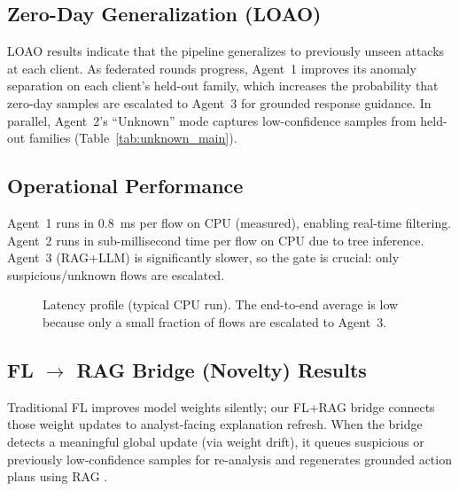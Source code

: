 \subsection{Zero-Day Generalization (LOAO)}
\label{sec:zeroday-narrative}

LOAO results indicate that the pipeline generalizes to previously unseen attacks at each client. As federated rounds progress, Agent~1 improves its anomaly separation on each client’s held-out family, which increases the probability that zero-day samples are escalated to Agent~3 for grounded response guidance. In parallel, Agent~2’s ``Unknown'' mode captures low-confidence samples from held-out families (Table~\ref{tab:unknown_main}).

\subsection{Operational Performance}
\label{sec:operational}

Agent~1 runs in \SI{0.8}{\milli\second} per flow on CPU (measured), enabling real-time filtering. Agent~2 runs in sub-millisecond time per flow on CPU due to tree inference. Agent~3 (RAG+LLM) is significantly slower, so the gate is crucial: only suspicious/unknown flows are escalated.

\begin{figure}[t]
\centering
{}
\caption{Latency profile (typical CPU run). The end-to-end average is low because only a small fraction of flows are escalated to Agent~3.}
\label{fig:latency}
\end{figure}

\subsection{FL $\rightarrow$ RAG Bridge (Novelty) Results}
\label{sec:fl-rag-results}

Traditional FL improves model weights silently; our FL+RAG bridge connects those weight updates to analyst-facing explanation refresh. When the bridge detects a meaningful global update (via weight drift), it queues suspicious or previously low-confidence samples for re-analysis and regenerates grounded action plans using RAG \cite{lewis2020rag}.

